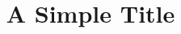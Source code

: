 \documentclass[11pt]{beamer}
\title{A Simple Title}
\subtitle{}
\author{}
\institute{}
\date{}
\begin{document}
\begin{frame}[plain]\titlepage\end{frame}
\end{document}
